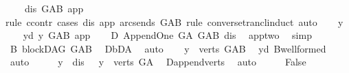 \begin{isabellebody}
\ \ \ {\isachardoublequoteopen}{\isasymnot}\ dis\ {\isasymrightarrow}\isactrlsup {\isacharplus}{\kern0pt}\isactrlbsub G{\isacharunderscore}{\kern0pt}AB\isactrlesub \ app{\isachardoublequoteclose}\ \isanewline
%
\isadelimproof
%
\endisadelimproof
%
\isatagproof
{}\isamarkupfalse%
{\isacharparenleft}{\kern0pt}rule\ ccontr{\isacharcomma}{\kern0pt}\ cases\ dis\ app\ {\isachardoublequoteopen}{\isacharparenleft}{\kern0pt}arcs{\isacharunderscore}{\kern0pt}ends\ G{\isacharunderscore}{\kern0pt}AB{\isacharparenright}{\kern0pt}{\isachardoublequoteclose}\ rule{\isacharcolon}{\kern0pt}\ converse{\isacharunderscore}{\kern0pt}trancl{\isacharunderscore}{\kern0pt}induct{\isacharcomma}{\kern0pt}\ auto{\isacharparenright}{\kern0pt}\isanewline
\ \ \isamarkupfalse%
\ y\isanewline
\ \ \isamarkupfalse%
\ y{\isacharunderscore}{\kern0pt}d{\isacharcolon}{\kern0pt}\ {\isachardoublequoteopen}y\ {\isasymrightarrow}\isactrlbsub G{\isacharunderscore}{\kern0pt}AB\isactrlesub \ app{\isachardoublequoteclose}\isanewline
\ \ \isamarkupfalse%
\ D{}{\isacharcolon}{\kern0pt}\ Append{\isacharunderscore}{\kern0pt}One\ G{\isacharunderscore}{\kern0pt}A\ G{\isacharunderscore}{\kern0pt}AB\ dis\ \isamarkupfalse%
\ app{\isacharunderscore}{\kern0pt}two\ \isamarkupfalse%
\ simp\isanewline
\ \ \isamarkupfalse%
\ B{}{\isacharcolon}{\kern0pt}\ blockDAG\ G{\isacharunderscore}{\kern0pt}AB\ \isamarkupfalse%
\ D{}{\isachardot}{\kern0pt}bD{\isacharunderscore}{\kern0pt}A\ \isamarkupfalse%
\ auto\isanewline
\ \ \isamarkupfalse%
\ {\isachardoublequoteopen}y\ {\isasymin}\ verts\ G{\isacharunderscore}{\kern0pt}AB{\isachardoublequoteclose}\ \isamarkupfalse%
\ y{\isacharunderscore}{\kern0pt}d\ B{}{\isachardot}{\kern0pt}wellformed\ \isamarkupfalse%
\ auto\isanewline
\ \ \isamarkupfalse%
\ \isamarkupfalse%
\ {\isachardoublequoteopen}y\ {\isacharequal}{\kern0pt}\ dis{\isachardoublequoteclose}\ {\isacharbar}{\kern0pt}\ \ {\isachardoublequoteopen}y\ {\isasymin}\ verts\ G{\isacharunderscore}{\kern0pt}A{\isachardoublequoteclose}\ \isamarkupfalse%
\ D{}{\isachardot}{\kern0pt}append{\isacharunderscore}{\kern0pt}verts\ \isamarkupfalse%
\ auto\isanewline
\ \ \isamarkupfalse%
\ \isamarkupfalse%
\ False\isanewline
\ \ \isamarkupfalse%

\end{isabellebody}
